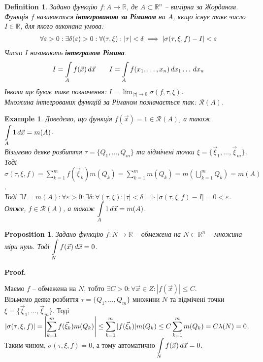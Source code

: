 \documentclass[a4paper, 10pt]{article}
\makeatletter
\def\huge{\displaystyle}
\def\qed{$\blacksquare$}
\theoremstyle{theoremdd}
\theoremstyle{theoremdd}
\newtheorem{definition}[theorem]{Definition}
\theoremstyle{theoremdd}
\theoremstyle{theoremdd}
\theoremstyle{theoremdd}
\newtheorem{example}[theorem]{Example}
\theoremstyle{theoremdd}
\theoremstyle{theoremdd}
\theoremstyle{theoremdd}
\theoremstyle{theoremdd}
\newtheorem{proposition}[theorem]{Proposition}
\theoremstyle{theoremdd}
\theoremstyle{theoremdd}
\theoremstyle{theoremdd}
\theoremstyle{theoremdd}
\theoremstyle{theoremdd}
\theoremstyle{theoremdd}
\renewenvironment{proof}[1][Proof.\\]{\par
\pushQED{\hfill \qed}%
\normalfont \topsep6\p@\@plus6\p@\relax
\trivlist
\item\relax
{\bfseries
#1\@addpunct{.}}\hspace\labelsep\ignorespaces
}{%
\popQED\endtrivlist\@endpefalse
}
\makeatother
\begin{document}
\begin{definition}
Задано функцію $f \colon A \to \mathbb{R}$, де $A \subset \mathbb{R}^n$ -- вимірна за Жорданом.\\
Функція $f$ називається \textbf{інтегрованою за Ріманом} на $A$, якщо існує таке число $I \in \mathbb{R}$, для якого виконана умова:
\begin{align*}
\forall \varepsilon > 0: \exists \delta(\varepsilon) > 0: \forall (\tau, \xi): |\tau| < \delta \implies \abs{\sigma(\tau, \xi, f) - I} < \varepsilon
\end{align*}
Число $I$ називають \textbf{інтегралом Рімана}.
\begin{align*}
I = \int\displaylimits_A f(\vec{x})\,d\vec{x} \qquad I = \int\displaylimits_A f(x_1,\dots,x_n)\,dx_1\dots \,dx_n
\end{align*}
Інколи ще буває таке позначення: $I = \huge\lim_{|\tau| \to 0} \sigma(f, \tau, \xi)$.\\
Множина інтегрованих функцій за Ріманом позначається так: $\mathcal{R}(A)$.
\end{definition}

\begin{example}
Доведемо, що функція $f(\vec{x}) = 1 \in \mathcal{R}(A)$, а також $\huge \int\displaylimits_A 1\,d\vec{x} = m(A)$.\\
Візьмемо деяке розбиття $\tau = \{Q_1,\dots,Q_m\}$ та відмічені точки $\xi = \{\vec{\xi}_1,\dots,\vec{\xi}_m\}$. Тоді\\
$\sigma(\tau, \xi, f) = \huge\sum_{k=1}^m f(\vec{\xi}_k) m(Q_k) = \sum_{k=1}^m m(Q_k) = m\left( \bigcup_{k=1}^m Q_k \right) = m(A)$.\\
Тоді $\exists I = m(A): \forall \varepsilon > 0: \exists \delta: \forall (\tau,\xi): |\tau| < \delta \implies |\sigma(\tau,\xi,f) - I| = 0 < \varepsilon$.\\
Отже, $f \in \mathcal{R}(A)$, а також $\huge \int\displaylimits_A 1\,d\vec{x} = m(A)$.
\end{example}

\begin{proposition}
Задано функцію $f \colon N \to \mathbb{R}$ -- обмежена на $N \subset \mathbb{R}^n$ -- множина міри нуль. Тоді $\huge\int\displaylimits_N f(\vec{x})\,d\vec{x} = 0$.
\end{proposition}

\begin{proof}
Маємо $f$ -- обмежена на $N$, тобто $\exists C>0: \forall \vec{x} \in Z: |f(\vec{x})| \leq C$.\\
Візьмемо деяке розбиття $\tau = \{Q_1,\dots,Q_m\}$ множини $N$ та відмічені точки $\xi = \{\vec{\xi}_1,\dots,\vec{\xi}_m\}$. Тоді\\
$|\sigma(\tau,\xi,f)| = \huge \abs{\sum_{k=1}^m f(\vec{\xi}_k) m(Q_k)} \leq \sum_{k=1}^m |f(\vec{\xi}_k)| m(Q_k) \leq C \sum_{k=1}^m m(Q_k) = C \lambda(N) = 0$.
Таким чином, $\sigma(\tau,\xi,f) = 0$, а тому автоматично $\huge\int\displaylimits_N f(\vec{x})\,d \vec{x} = 0$.
\end{proof}
\end{document}
